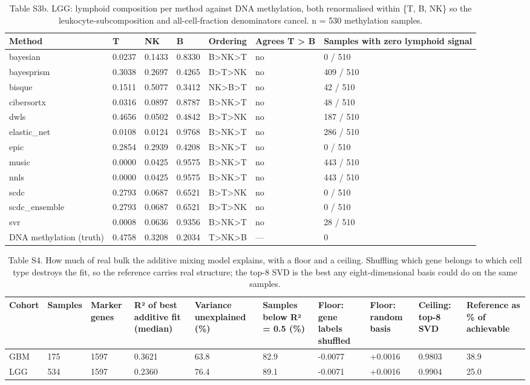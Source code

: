 \begin{table}[htbp]
\centering
\small
\caption{Table S3b. LGG: lymphoid composition per method against DNA methylation, both renormalised within \{T, B, NK\} so the leukocyte-subcomposition and all-cell-fraction denominators cancel. n = 530 methylation samples.}
\label{tab:S3_lymphoid_lgg}
\begin{tabular}{lllllll}
\toprule
\textbf{Method} & \textbf{T} & \textbf{NK} & \textbf{B} & \textbf{Ordering} & \textbf{Agrees T > B} & \textbf{Samples with zero lymphoid signal} \\
\midrule
bayesian & 0.0237 & 0.1433 & 0.8330 & B>NK>T & no & 0 / 510 \\
bayesprism & 0.3038 & 0.2697 & 0.4265 & B>T>NK & no & 409 / 510 \\
bisque & 0.1511 & 0.5077 & 0.3412 & NK>B>T & no & 42 / 510 \\
cibersortx & 0.0316 & 0.0897 & 0.8787 & B>NK>T & no & 48 / 510 \\
dwls & 0.4656 & 0.0502 & 0.4842 & B>T>NK & no & 187 / 510 \\
elastic\_net & 0.0108 & 0.0124 & 0.9768 & B>NK>T & no & 286 / 510 \\
epic & 0.2854 & 0.2939 & 0.4208 & B>NK>T & no & 0 / 510 \\
music & 0.0000 & 0.0425 & 0.9575 & B>NK>T & no & 443 / 510 \\
nnls & 0.0000 & 0.0425 & 0.9575 & B>NK>T & no & 443 / 510 \\
scdc & 0.2793 & 0.0687 & 0.6521 & B>T>NK & no & 0 / 510 \\
scdc\_ensemble & 0.2793 & 0.0687 & 0.6521 & B>T>NK & no & 0 / 510 \\
svr & 0.0008 & 0.0636 & 0.9356 & B>NK>T & no & 28 / 510 \\
DNA methylation (truth) & 0.4758 & 0.3208 & 0.2034 & T>NK>B & — & 0 \\
\bottomrule
\end{tabular}
\end{table}

\begin{table}[htbp]
\centering
\small
\caption{Table S4. How much of real bulk the additive mixing model explains, with a floor and a ceiling. Shuffling which gene belongs to which cell type destroys the fit, so the reference carries real structure; the top-8 SVD is the best any eight-dimensional basis could do on the same samples.}
\label{tab:S4_model_fit}
\begin{tabular}{llllllllll}
\toprule
\textbf{Cohort} & \textbf{Samples} & \textbf{Marker genes} & \textbf{R² of best additive fit (median)} & \textbf{Variance unexplained (\%)} & \textbf{Samples below R² = 0.5 (\%)} & \textbf{Floor: gene labels shuffled} & \textbf{Floor: random basis} & \textbf{Ceiling: top-8 SVD} & \textbf{Reference as \% of achievable} \\
\midrule
GBM & 175 & 1597 & 0.3621 & 63.8 & 82.9 & -0.0077 & +0.0016 & 0.9803 & 38.9 \\
LGG & 534 & 1597 & 0.2360 & 76.4 & 89.1 & -0.0071 & +0.0016 & 0.9904 & 25.0 \\
\bottomrule
\end{tabular}
\end{table}

